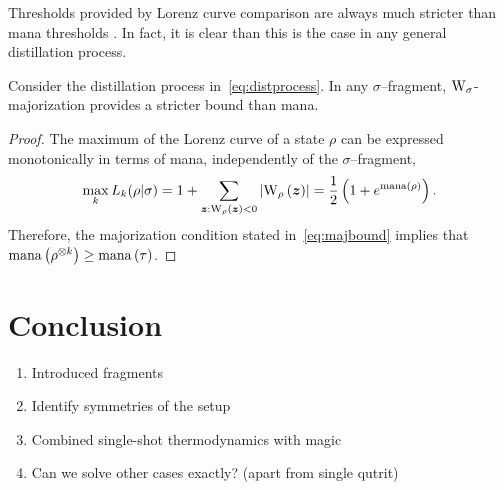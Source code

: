 \documentclass[pra,
aps,
twocolumn,
superscriptaddress,
groupedaddress,
nofootinbib,
reprint
]{revtex4-1}
\begin{document}
Thresholds provided by Lorenz curve comparison are always much stricter than mana thresholds .
In fact, it is clear than this is the case in any general distillation process.
\begin{theorem}\label{thm:bounds}
    Consider the distillation process in~\cref{eq:distprocess}.
    In any $\sigma$--fragment, $\W{\sigma}$-majorization provides a stricter bound than mana.
\end{theorem}
\begin{proof}
    The maximum of the Lorenz curve of a state $\rho$ can be expressed monotonically in terms of mana, independently of the $\sigma$--fragment,
    \begin{equation}
        \max_k{L_k(\rho | \sigma)} = 1 + \sum_{\bmz: \W[\bmz]{\rho}<0} \abs{\W[\bmz]{\rho}} = \frac{1}{2} \left( 1 + e^\mana{\rho} \right).
    \end{equation}
    Therefore, the majorization condition stated in~\cref{eq:majbound} implies that ${{\rm{mana}}\left(\rho^{\otimes k}\right)} \geq {{\rm{mana}}\left(\tau\right)}$. 
\end{proof}


\section{Conclusion}
\label{sec:conc}

\begin{enumerate}
    \item Introduced fragments
    \item Identify symmetries of the setup
    \item Combined single-shot thermodynamics with magic 
    \item Can we solve other cases exactly? (apart from single qutrit)
\end{enumerate}



%


\appendix

\end{document}
